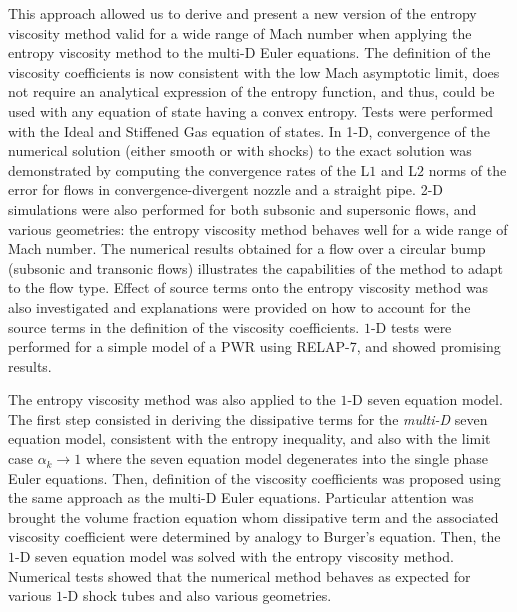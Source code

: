 This approach allowed us to derive and present a new version of the entropy viscosity method valid for a wide range of Mach number when applying the entropy viscosity method to the multi-D Euler equations. The definition of the viscosity coefficients is now consistent with the low Mach asymptotic limit, does not require an analytical expression of the entropy function, and thus, could be used with any equation of state having a convex entropy. Tests were performed with the Ideal and Stiffened Gas equation of states. In 1-D, convergence of the numerical solution (either smooth or with shocks) to the exact solution was demonstrated by computing the convergence rates of the L$1$ and L$2$ norms of the error for flows in convergence-divergent nozzle and a straight pipe. 2-D simulations were also performed for both subsonic and supersonic flows, and various geometries: the entropy viscosity method behaves well for a wide range of Mach number. The numerical results obtained for a flow over a circular bump (subsonic and transonic flows) illustrates the capabilities of the method to adapt to the flow type.
Effect of source terms onto the entropy viscosity method was also investigated and explanations were provided on how to account for the source terms in the definition of the viscosity coefficients. $1$-D tests were performed for a simple model of a PWR using RELAP-7, and showed promising results. 

The entropy viscosity method was also applied to the $1$-D seven equation model. The first step consisted in deriving the dissipative terms for the \emph{multi-D} seven equation model, consistent with the entropy inequality, and also with the limit case $\alpha_k \to 1$ where the seven equation model degenerates into the single phase Euler equations. Then, definition of the viscosity coefficients was proposed using the same approach as the multi-D Euler equations. Particular attention was brought the volume fraction equation whom dissipative term and the associated viscosity coefficient were determined by analogy to Burger's equation. Then, the $1$-D seven equation model was solved with the entropy viscosity method. Numerical tests showed that the numerical method behaves as expected for various $1$-D shock tubes and also various geometries.


